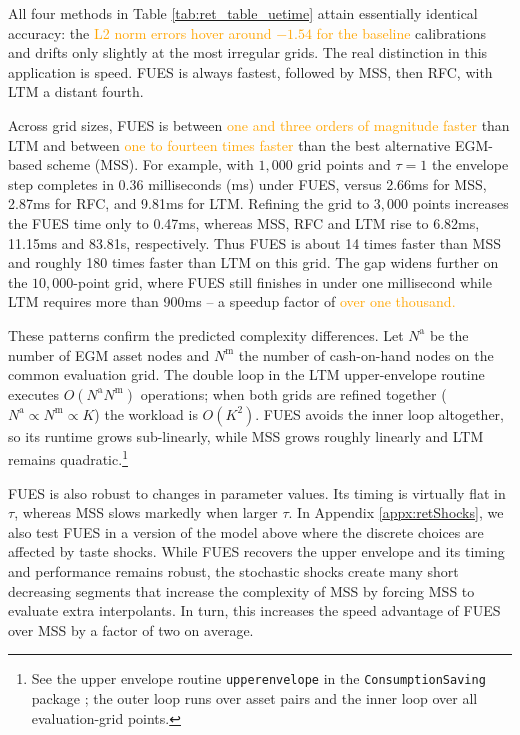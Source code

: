 \documentclass[12pt]{article}
\begin{document}
All four methods in Table \ref{tab:ret_table_uetime} attain essentially identical accuracy: the \textcolor{orange}{L2 norm errors hover around $-1.54$ for the baseline} calibrations and drifts only slightly at the most irregular grids.
The real distinction in this application is speed. FUES is always fastest, followed by MSS, then RFC, with LTM a distant fourth.

Across grid sizes, FUES is between \textcolor{orange}{one and three orders of magnitude faster} than LTM and between \textcolor{orange}{one to fourteen times faster} than the best alternative EGM-based scheme (MSS).
For example, with $1,000$ grid points and $\tau=1$ the envelope step completes in 0.36 milliseconds (ms) under FUES, versus 2.66ms for MSS, 2.87ms for RFC, and 9.81ms for LTM.
Refining the grid to $3,000$ points increases the FUES time only to 0.47ms, whereas MSS, RFC and LTM rise to 6.82ms, 11.15ms and 83.81s, respectively.
Thus FUES is about 14 times faster than MSS and roughly 180 times faster than LTM on this grid.
The gap widens further on the $10,000$-point grid, where FUES still finishes in under one millisecond while LTM requires more than 900ms -- a speedup factor of \textcolor{orange}{over one thousand.} 

These patterns confirm the predicted complexity differences. Let $N^{\mathrm a}$ be the number of EGM asset nodes and $N^{\mathrm m}$ the number of cash-on-hand nodes on the common evaluation grid.
The double loop in the LTM upper-envelope routine executes $O(N^{\mathrm a} N^{\mathrm m})$ operations; when both grids are refined together ($N^{\mathrm a}\propto N^{\mathrm m}\propto K$) the workload is $O(K^{2})$.
FUES avoids the inner loop altogether, so its runtime grows sub-linearly, while MSS grows roughly linearly and LTM remains quadratic.\footnote{See the upper envelope routine \texttt{upperenvelope} in the \texttt{ConsumptionSaving} package \citep{druedahl2024consav}; the outer loop runs over asset pairs and the inner loop over all evaluation-grid points.} 

FUES is also robust to changes in parameter values.
Its timing is virtually flat in $\tau$, whereas MSS slows markedly when larger $\tau$. In Appendix \ref{appx:retShocks}, we also test FUES in a version of the model above where the discrete choices are affected by taste shocks. While FUES recovers the upper envelope and its timing and performance remains robust, the stochastic shocks create many short decreasing segments that increase the complexity of MSS by forcing MSS to evaluate extra interpolants. In turn, this increases the speed advantage of FUES over MSS by a factor of two on average.
\end{document}
